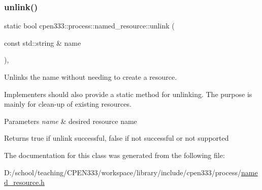\mbox{\label{classcpen333_1_1process_1_1named__resource_a6cb427f033b51f08fcf2bc1e08bd6a32}} 
\subsubsection{\texorpdfstring{unlink()}{unlink()}\hspace{0.1cm}{\footnotesize\ttfamily [2/2]}}
{\footnotesize\ttfamily static bool cpen333\+::process\+::named\+\_\+resource\+::unlink (\begin{DoxyParamCaption}\item[{const std\+::string \&}]{name }\end{DoxyParamCaption})\hspace{0.3cm}{\ttfamily [inline]}, {\ttfamily [static]}}



Unlinks the name without needing to create a resource. 

Implementers should also provide a static method for unlinking. The purpose is mainly for clean-\/up of existing resources.


\begin{DoxyParams}{Parameters}
{\em name} & desired resource name \\
\hline
\end{DoxyParams}
\begin{DoxyReturn}{Returns}
{\ttfamily true} if unlink successful, {\ttfamily false} if not successful or not supported 
\end{DoxyReturn}


The documentation for this class was generated from the following file\+:\begin{DoxyCompactItemize}
\item 
D\+:/school/teaching/\+C\+P\+E\+N333/workspace/library/include/cpen333/process/\hyperlink{named__resource_8h}{named\+\_\+resource.\+h}\end{DoxyCompactItemize}
